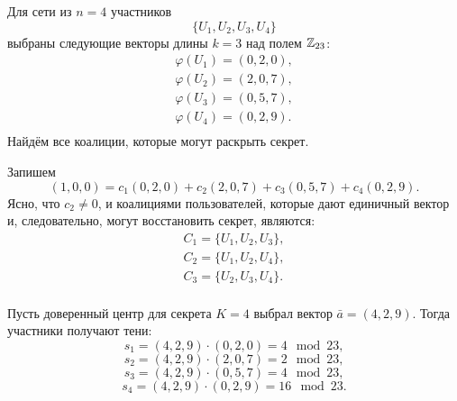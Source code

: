 %
%
%
%

\example
Для сети из $n=4$ участников
    \[ \{ U_1, U_2, U_3, U_4 \} \]
выбраны следующие векторы длины $k=3$ над полем $\mathbb{Z}_{23}$:
\[ \begin{array}{l}
    \varphi(U_1) = (0,2,0), \\
    \varphi(U_2) = (2,0,7), \\
    \varphi(U_3) = (0,5,7), \\
    \varphi(U_4) = (0,2,9). \\
\end{array} \]
Найдём все коалиции, которые могут раскрыть секрет.

Запишем
    \[ (1,0,0) = c_1 (0,2,0) + c_2 (2,0,7) + c_3 (0,5,7) + c_4 (0,2,9). \]
Ясно, что $c_2 \neq 0$, и коалициями пользователей, которые дают единичный вектор и, следовательно, могут восстановить секрет, являются:
\[ \begin{array}{l}
    C_1 = \{ U_1, U_2, U_3 \}, \\
    C_2 = \{ U_1, U_2, U_4 \}, \\
    C_3 = \{ U_2, U_3, U_4 \}. \\
\end{array} \]

Пусть доверенный центр для секрета $K=4$ выбрал вектор $\bar{a} = (4, 2, 9)$. Тогда участники получают тени:
    \[ s_1 = (4,2,9) \cdot (0,2,0) = 4 \mod 23, \]
    \[ s_2 = (4,2,9) \cdot (2,0,7) = 2 \mod 23, \]
    \[ s_3 = (4,2,9) \cdot (0,5,7) = 4 \mod 23, \]
    \[ s_4 = (4,2,9) \cdot (0,2,9) = 16 \mod 23. \]

